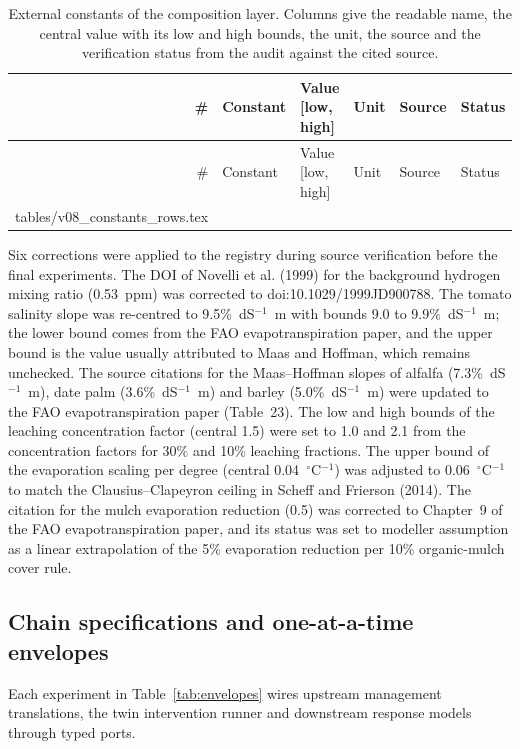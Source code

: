 \documentclass[11pt,a4paper]{article}
\makeatletter
\newcommand{\ConstantRows}{\@@input tables/v08_constants_rows.tex }
\makeatother
\begin{document}
{\footnotesize\setlength{\tabcolsep}{3pt}\begin{longtable}{@{}rp{3.9cm}p{3.1cm}p{2.5cm}p{3.1cm}p{2.1cm}@{}}
\caption{External constants of the composition layer. Columns give the readable name, the central value with its low and high bounds, the unit, the source and the verification status from the audit against the cited source.}\label{tab:constants}\\\toprule
\# & Constant & Value [low, high] & Unit & Source & Status\\\midrule\endfirsthead
\toprule \# & Constant & Value [low, high] & Unit & Source & Status\\\midrule\endhead
\ConstantRows
\bottomrule
\end{longtable}}

Six corrections were applied to the registry during source verification before the final experiments. The DOI of Novelli et al. (1999) for the background hydrogen mixing ratio (0.53~ppm) was corrected to doi:10.1029/1999JD900788. The tomato salinity slope was re-centred to 9.5\%~dS$^{-1}$~m with bounds 9.0 to 9.9\%~dS$^{-1}$~m; the lower bound comes from the FAO evapotranspiration paper, and the upper bound is the value usually attributed to Maas and Hoffman, which remains unchecked. The source citations for the Maas--Hoffman slopes of alfalfa (7.3\%~dS$^{-1}$~m), date palm (3.6\%~dS$^{-1}$~m) and barley (5.0\%~dS$^{-1}$~m) were updated to the FAO evapotranspiration paper (Table~23). The low and high bounds of the leaching concentration factor (central 1.5) were set to 1.0 and 2.1 from the concentration factors for 30\% and 10\% leaching fractions. The upper bound of the evaporation scaling per degree (central 0.04~$^\circ$C$^{-1}$) was adjusted to 0.06~$^\circ$C$^{-1}$ to match the Clausius--Clapeyron ceiling in Scheff and Frierson (2014). The citation for the mulch evaporation reduction (0.5) was corrected to Chapter~9 of the FAO evapotranspiration paper, and its status was set to modeller assumption as a linear extrapolation of the 5\% evaporation reduction per 10\% organic-mulch cover rule.

\subsection{Chain specifications and one-at-a-time envelopes}
Each experiment in Table~\ref{tab:envelopes} wires upstream management translations, the twin intervention runner and downstream response models through typed ports.
\end{document}

